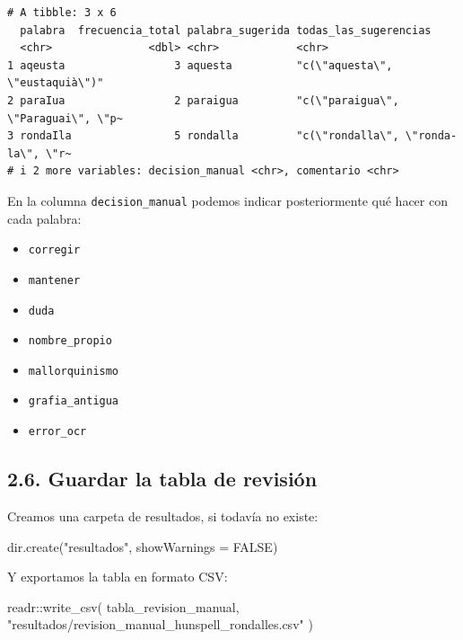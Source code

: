 \documentclass[
  letterpaper,
  DIV=11,
  numbers=noendperiod]{scrreprt}
\newenvironment{Shaded}{\begin{snugshade}}{\end{snugshade}}
\newcommand{\AttributeTok}[1]{\textcolor[rgb]{0.40,0.45,0.13}{#1}}
\newcommand{\ConstantTok}[1]{\textcolor[rgb]{0.56,0.35,0.01}{#1}}
\newcommand{\FunctionTok}[1]{\textcolor[rgb]{0.28,0.35,0.67}{#1}}
\newcommand{\NormalTok}[1]{\textcolor[rgb]{0.00,0.23,0.31}{#1}}
\newcommand{\SpecialCharTok}[1]{\textcolor[rgb]{0.37,0.37,0.37}{#1}}
\newcommand{\StringTok}[1]{\textcolor[rgb]{0.13,0.47,0.30}{#1}}
\providecommand{\tightlist}{%
  \setlength{\itemsep}{0pt}\setlength{\parskip}{0pt}}
\begin{document}
\begin{verbatim}
# A tibble: 3 x 6
  palabra  frecuencia_total palabra_sugerida todas_las_sugerencias              
  <chr>               <dbl> <chr>            <chr>                              
1 aqeusta                 3 aquesta          "c(\"aquesta\", \"eustaquià\")"    
2 paraIua                 2 paraigua         "c(\"paraigua\", \"Paraguai\", \"p~
3 rondaIla                5 rondalla         "c(\"rondalla\", \"ronda-la\", \"r~
# i 2 more variables: decision_manual <chr>, comentario <chr>
\end{verbatim}

En la columna \texttt{decision\_manual} podemos indicar posteriormente
qué hacer con cada palabra:

\begin{itemize}
\tightlist
\item
  \texttt{corregir}
\item
  \texttt{mantener}
\item
  \texttt{duda}
\item
  \texttt{nombre\_propio}
\item
  \texttt{mallorquinismo}
\item
  \texttt{grafia\_antigua}
\item
  \texttt{error\_ocr}
\end{itemize}

\subsection{2.6. Guardar la tabla de
revisión}\label{guardar-la-tabla-de-revisiuxf3n}

Creamos una carpeta de resultados, si todavía no existe:

\begin{Shaded}
\begin{Highlighting}[]
\FunctionTok{dir.create}\NormalTok{(}\StringTok{"resultados"}\NormalTok{, }\AttributeTok{showWarnings =} \ConstantTok{FALSE}\NormalTok{)}
\end{Highlighting}
\end{Shaded}

Y exportamos la tabla en formato CSV:

\begin{Shaded}
\begin{Highlighting}[]
\NormalTok{readr}\SpecialCharTok{::}\FunctionTok{write\_csv}\NormalTok{(}
\NormalTok{  tabla\_revision\_manual,}
  \StringTok{"resultados/revision\_manual\_hunspell\_rondalles.csv"}
\NormalTok{)}
\end{Highlighting}
\end{Shaded}
\end{document}
